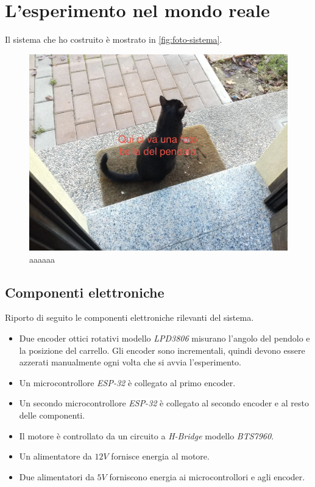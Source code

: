 \section{L'esperimento nel mondo reale}
\label{sec:sistema-reale}
Il sistema che ho costruito è mostrato in \autoref{fig:foto-sistema}.

\begin{figure}[H]
    \centering
    \includegraphics[width=\textwidth]{assets/foto-pendolo}
    \caption[Foto dell'esperimento]{aaaaaa}
    \label{fig:foto-sistema}
\end{figure}

\subsection{Componenti elettroniche}
Riporto di seguito le componenti elettroniche rilevanti del sistema.
\begin{itemize}
    \item Due encoder ottici rotativi modello \emph{LPD3806} misurano l'angolo
    del pendolo e la posizione del carrello.
    Gli encoder sono incrementali, quindi devono essere azzerati manualmente
    ogni volta che si avvia l'esperimento.

    \item Un microcontrollore \emph{ESP-32} è collegato al primo encoder.

    \item Un secondo microcontrollore \emph{ESP-32} è collegato al
    secondo encoder e al resto delle componenti.

    \item Il motore è controllato da un circuito a \emph{H-Bridge}
    modello \emph{BTS7960}.

    \item Un alimentatore da $12V$ fornisce energia al motore.

    \item Due alimentatori da $5V$ forniscono energia ai microcontrollori
    e agli encoder.
\end{itemize}

